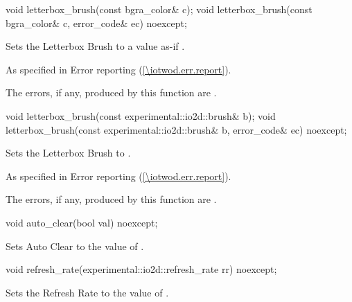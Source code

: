 \begin{itemdecl}
void letterbox_brush(const bgra_color& c);
void letterbox_brush(const bgra_color& c, error_code& ec) noexcept;
\end{itemdecl}
\begin{itemdescr}
\pnum
\effects
Sets the Letterbox Brush to a value as-if .

\pnum
\throws
As specified in Error reporting (\ref{\iotwod.err.report}).

\pnum
\errors
The errors, if any, produced by this function are .
\end{itemdescr}

\begin{itemdecl}
void letterbox_brush(const experimental::io2d::brush& b);
void letterbox_brush(const experimental::io2d::brush& b, error_code& ec) 
  noexcept;
\end{itemdecl}
\begin{itemdescr}
\pnum
\effects
Sets the Letterbox Brush to .

\pnum
\throws
As specified in Error reporting (\ref{\iotwod.err.report}).

\pnum
\errors
The errors, if any, produced by this function are .
\end{itemdescr}

\begin{itemdecl}
void auto_clear(bool val) noexcept;
\end{itemdecl}
\begin{itemdescr}
\pnum
\effects
Sets Auto Clear to the value of .
\end{itemdescr}

\begin{itemdecl}
void refresh_rate(experimental::io2d::refresh_rate rr) noexcept;
\end{itemdecl}
\begin{itemdescr}
\pnum
\effects
Sets the Refresh Rate to the value of .
\end{itemdescr}

